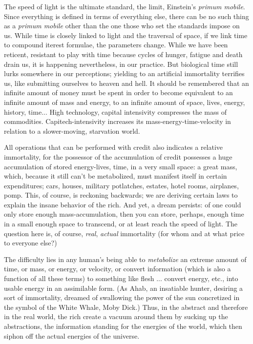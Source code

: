 The speed of light is the ultimate standard,
the limit, Einstein's \emph{primum mobile}. Since
everything is defined in terms of everything
else, there can be no such thing as a \emph{primum
mobile} other than the one those who set the
standards impose on us. While time is
closely linked to light and the traversal of
space, if we link time to compound iterest
formulae, the parameters change. While we
have been reticent, resistant to play with
time because cycles of hunger, fatigue and
death drain us, it is happening nevertheless,
in our practice. But biological time still lurks
somewhere in our perceptions; yielding to
an artificial immortality terrifies us,
like submitting ourselves to heaven and hell.
It should be remembered that an infinite
amount of money must be spent in order to
become equivalent to an infinite amount of
mass and energy, to an infinite amount of
space, lives, energy, history, time... High
technology, capital intensivity compresses
the mass of commodities. Capitech-intensivity increases its mass-energy-time-velocity
in relation to a slower-moving, starvation world.

All operations that can be performed with
credit also indicates a relative immortality,
for the possessor of the accumulation of
credit possesses a huge accumulation of
stored energy-lives, time, in a very small
space: a great mass, which, because it still
can't be metabolized, must manifest itself in
certain expenditures; cars, houses, military
potlatches, estates, hotel rooms, airplanes,
pomp. This, of course, is reckoning backwards; we are deriving certain laws to explain the insane behavior of the rich. And
yet, a dream persists: of one could only store
enough mass-accumulation, then you can
store, perhaps, enough time in a small enough
space to transcend, or at least reach the
speed of light. The question here is, of
course, \emph{real}, \emph{actual} immortality (for whom
and at what price to everyone else?)

The difficulty lies in any human's being able to \emph{metabolize} an extreme amount of
time, or mass, or energy, or velocity, or convert information (which is also a function of all these terms) to something like flesh ...
convert energy, etc., into usable
energy in an assimilable form. (As Ahab, an
insatiable hunter, desiring a sort of immortality, dreamed of swallowing the power of
the sun concretized in the symbol of the
White Whale, Moby Dick.) Thus, in the abstract and therefore in the real world, the
rich create a vacuum around them by sucking up the abstractions, the information
standing for the energies of the world, which
then siphon off the actual energies of the
universe.


